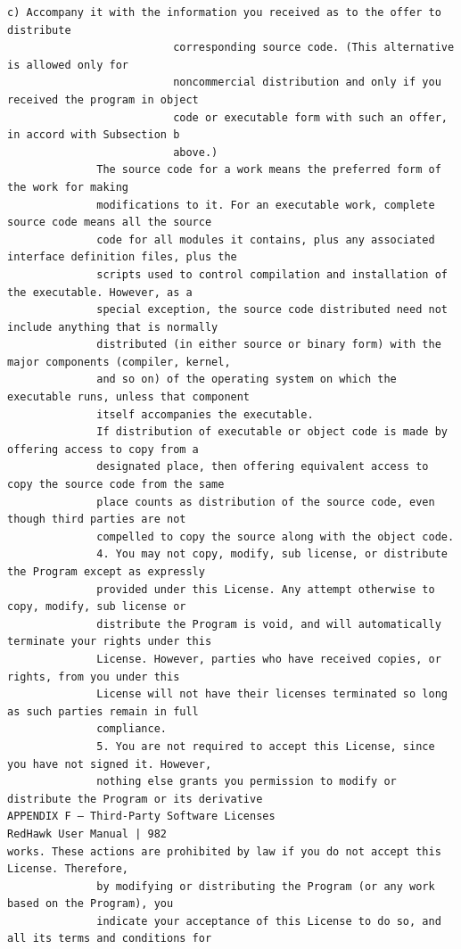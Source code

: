 \begin{lstlisting}[basicstyle=\ttfamily\scriptsize,breaklines=true]
                      c) Accompany it with the information you received as to the offer to distribute
                          corresponding source code. (This alternative is allowed only for
                          noncommercial distribution and only if you received the program in object
                          code or executable form with such an offer, in accord with Subsection b
                          above.)
              The source code for a work means the preferred form of the work for making
              modifications to it. For an executable work, complete source code means all the source
              code for all modules it contains, plus any associated interface definition files, plus the
              scripts used to control compilation and installation of the executable. However, as a
              special exception, the source code distributed need not include anything that is normally
              distributed (in either source or binary form) with the major components (compiler, kernel,
              and so on) of the operating system on which the executable runs, unless that component
              itself accompanies the executable.
              If distribution of executable or object code is made by offering access to copy from a
              designated place, then offering equivalent access to copy the source code from the same
              place counts as distribution of the source code, even though third parties are not
              compelled to copy the source along with the object code.
              4. You may not copy, modify, sub license, or distribute the Program except as expressly
              provided under this License. Any attempt otherwise to copy, modify, sub license or
              distribute the Program is void, and will automatically terminate your rights under this
              License. However, parties who have received copies, or rights, from you under this
              License will not have their licenses terminated so long as such parties remain in full
              compliance.
              5. You are not required to accept this License, since you have not signed it. However,
              nothing else grants you permission to modify or distribute the Program or its derivative
APPENDIX F — Third-Party Software Licenses                                    RedHawk User Manual | 982
works. These actions are prohibited by law if you do not accept this License. Therefore,
              by modifying or distributing the Program (or any work based on the Program), you
              indicate your acceptance of this License to do so, and all its terms and conditions for

\end{lstlisting}

